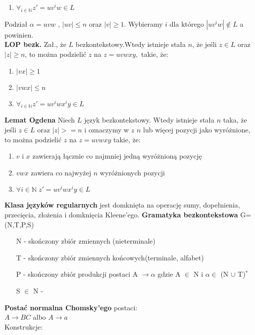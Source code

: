 \begin{multicols}{3}
\begin{enumerate}
      \item $\forall_{i \in \mathbb{N}} z'=uv^{i}w \in L$
    \end{enumerate}
    Podział $\alpha = uvw$ , $|uv| \leqslant n$ oraz $|v| \geqslant 1$.
    Wybieramy $i$ dla którego $|uv^{i}w| \notin L$ a powinien. \\
    \textbf{LOP bezk.} Zał., że $L$ bezkontekstowy.Wtedy istnieje stała $n$, że jeśli $z \in L$ oraz $|z| \geqslant n$, to można podzielić $z$ na $z=uvwxy,$ takie, że:
    \begin{enumerate}
      \item $|vx| \geqslant 1$
      \item $|vwx| \leqslant n$
      \item $\forall_{i \in \mathbb{N}} z'=uv^{i}wx^{i}y \in L$
    \end{enumerate}
    \textbf{Lemat Ogdena} Niech $L$ język bezkontekstowy. Wtedy istnieje stała $n$ taka, że jeśli $z \in L$ oraz $|z| >= n$ i oznaczymy w $z$ $n$ lub więcej pozycji jako wyróżnione, to można podzielić $z$ na $z = uvwxy$ takie, że:
    \begin{enumerate}
      \item $v$ i $x$ zawierają łącznie co najmniej jedną wyróżnioną pozycję
      \item $vwx$ zawiera co najwyżej $n$ wyróżnionych pozycji
      \item $\forall i \in \mathbb{N} \; z' = uv^{i}wx^{i}y \in L$
    \end{enumerate} 
    \textbf{Klasa języków regularnych} jest domknięta na operację sumy, 
    dopełnienia, przecięcia, złożenia i domknięcia Kleene'ego.
    \textbf{Gramatyka bezkontekstowa} G=(N,T,P,S)
    \begin{enumerate}
      \item[N] - skończony zbiór zmiennych (nieterminale)
      \item[T] - skończony zbiór zmiennych końcowych(terminale, alfabet)
      \item[P] - skończony zbiór produkcji postaci A $\rightarrow \alpha$ gdzie A $\in$ N i $\alpha \in$ (N $\cup$ T)$^{*}$
      \item[S] $\in$ N - 
    \end{enumerate} 
    \textbf{Postać normalna Chomsky'ego} postaci:\\
    $A \rightarrow BC$ albo $A \rightarrow a$\\
    Konstrukcje:\\
    \begin{enumerate}

\end{enumerate}
\end{multicols}
